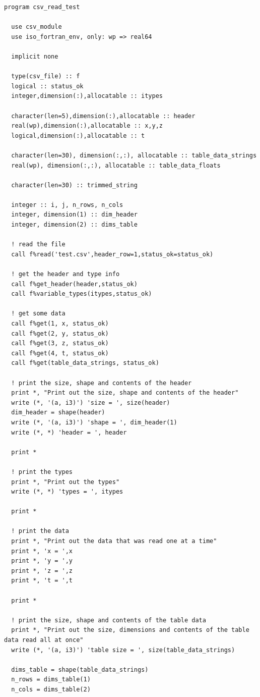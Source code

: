 \begin{verbatim}
program csv_read_test

  use csv_module
  use iso_fortran_env, only: wp => real64
  
  implicit none
  
  type(csv_file) :: f
  logical :: status_ok
  integer,dimension(:),allocatable :: itypes

  character(len=5),dimension(:),allocatable :: header
  real(wp),dimension(:),allocatable :: x,y,z
  logical,dimension(:),allocatable :: t

  character(len=30), dimension(:,:), allocatable :: table_data_strings
  real(wp), dimension(:,:), allocatable :: table_data_floats

  character(len=30) :: trimmed_string
    
  integer :: i, j, n_rows, n_cols
  integer, dimension(1) :: dim_header
  integer, dimension(2) :: dims_table
  
  ! read the file
  call f%read('test.csv',header_row=1,status_ok=status_ok)
  
  ! get the header and type info
  call f%get_header(header,status_ok)
  call f%variable_types(itypes,status_ok)
  
  ! get some data
  call f%get(1, x, status_ok)
  call f%get(2, y, status_ok)
  call f%get(3, z, status_ok)
  call f%get(4, t, status_ok)
  call f%get(table_data_strings, status_ok)

  ! print the size, shape and contents of the header
  print *, "Print out the size, shape and contents of the header"
  write (*, '(a, i3)') 'size = ', size(header)
  dim_header = shape(header)
  write (*, '(a, i3)') 'shape = ', dim_header(1)
  write (*, *) 'header = ', header

  print *

  ! print the types
  print *, "Print out the types"
  write (*, *) 'types = ', itypes

  print *
  
  ! print the data
  print *, "Print out the data that was read one at a time"
  print *, 'x = ',x
  print *, 'y = ',y
  print *, 'z = ',z
  print *, 't = ',t

  print *

  ! print the size, shape and contents of the table data
  print *, "Print out the size, dimensions and contents of the table data read all at once"
  write (*, '(a, i3)') 'table size = ', size(table_data_strings)

  dims_table = shape(table_data_strings)
  n_rows = dims_table(1)
  n_cols = dims_table(2)


\end{verbatim}
